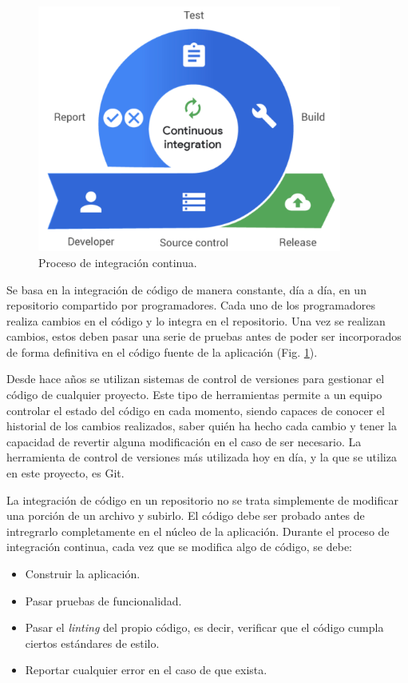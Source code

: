 \begin{figure}
  \centerline{\includegraphics[width=10cm]{figuras/ci}}
  \caption{Proceso de integración continua.\cite{img:ci}}
  \label{fig:ci}
\end{figure}

Se basa en la integración de código de manera constante, día a día, en un repositorio compartido por programadores. Cada uno de los programadores realiza cambios en el código y lo integra en el repositorio. Una vez se realizan cambios, estos deben pasar una serie de pruebas antes de poder ser incorporados de forma definitiva en el código fuente de la aplicación (Fig. \ref{fig:ci}).

Desde hace años se utilizan sistemas de control de versiones para gestionar el código de cualquier proyecto. Este tipo de herramientas permite a un equipo controlar el estado del código en cada momento, siendo capaces de conocer el historial de los cambios realizados, saber quién ha hecho cada cambio y tener la capacidad de revertir alguna modificación en el caso de ser necesario. La herramienta de control de versiones más utilizada hoy en día, y la que se utiliza en este proyecto, es Git\cite{git}.

La integración de código en un repositorio no se trata simplemente de modificar una porción de un archivo y subirlo. El código debe ser probado antes de intregrarlo completamente en el núcleo de la aplicación. Durante el proceso de integración continua, cada vez que se modifica algo de código, se debe:

\begin{itemize}
  \item Construir la aplicación.
  \item Pasar pruebas de funcionalidad.
  \item Pasar el \textit{linting} del propio código, es decir, verificar que el código cumpla ciertos estándares de estilo.
  \item Reportar cualquier error en el caso de que exista.
\end{itemize}


